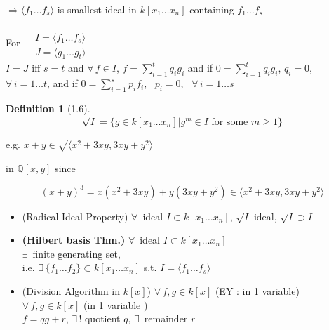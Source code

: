 \documentclass[10pt]{amsart}
\newtheorem{definition}{Definition}
\newcommand{\exercisehead}[1]
  { \smallskip
   \noindent{\small\bf Exercise #1.}
  }
\begin{document}
\begin{multicols*}{2}
$\Longrightarrow \langle f_1 \dots f_s \rangle$ is smallest ideal in $k[x_1 \dots x_n]$ containing $f_1 \dots f_s$


\exercisehead{4} For $\begin{aligned} & \quad \\
  & I = \langle f_1 \dots f_s \rangle \\
  & J = \langle g_1 \dots g_t \rangle \end{aligned}$ \\

 $I = J$ iff $s=t$ and $\forall \, f \in I$, $f = \sum_{i=1}^t q_i g_i$ and if $ 0  = \sum_{i=1}^t q_i g_i$, $q_i =0$, \, $\forall \, i = 1 \dots t$, and if $0 = \sum_{i=1}^s p_i f_i$, \, $p_i = 0$, \, $\forall \,  i = 1 \dots s$


\begin{definition}[1.6]
\[
\sqrt{I} = \lbrace g \in k[x_1\dots x_n] | g^m \in I \text{ for some } m \geq 1 \rbrace
\]
\end{definition}

e.g. $x+y \in \sqrt{ \langle x^2 + 3 xy , 3xy + y^2 \rangle }$

in $\mathbb{Q}[x,y]$ since 

\[
(x+y)^3 =x(x^2 + 3xy) + y(3xy + y^2) \in \langle x^2 + 3xy, 3xy + y^2\rangle
\]






\begin{itemize}
\item (Radical Ideal Property) $\forall \, $ ideal $I\subset k[x_1 \dots x_n]$, $\sqrt{I}$ ideal, $\sqrt{I} \supset I$
\item \textbf{(Hilbert basis Thm.)} $\forall \, $ ideal $I\subset k[x_1\dots x_n]$ \\
$\exists \, $ finite generating set, \\
i.e. $\exists \, \lbrace f_1 \dots f_2 \rbrace \subset k [x_1 \dots x_n]$ s.t. $I=\langle f_1 \dots f_s \rangle$
\item (Division Algorithm in $k[x]$) $\forall \, f,g \in  k[x]$ (EY : in 1 variable) \\
$\forall \, f, g \in k[x]$ (in 1 variable )\\
$f= qg + r$, $\exists \, !$ quotient $q$, $\exists \, $ remainder $r$
\end{itemize}


\end{multicols*}
\end{document}
